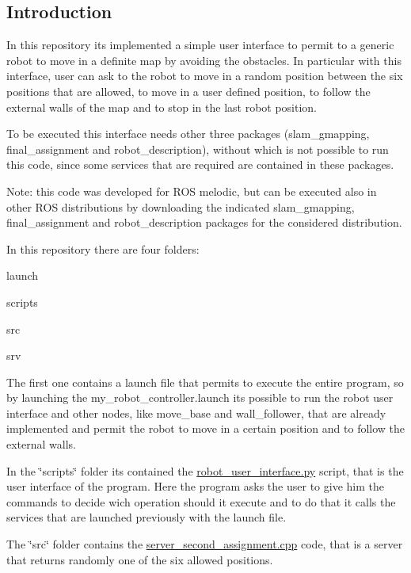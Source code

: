 \subsection*{Introduction}

In this repository it\textquotesingle{}s implemented a simple user interface to permit to a generic robot to move in a definite map by avoiding the obstacles. In particular with this interface, user can ask to the robot to move in a random position between the six positions that are allowed, to move in a user defined position, to follow the external walls of the map and to stop in the last robot position.

To be executed this interface needs other three packages (slam\+\_\+gmapping, final\+\_\+assignment and robot\+\_\+description), without which is not possible to run this code, since some services that are required are contained in these packages.

Note\+: this code was developed for R\+OS melodic, but can be executed also in other R\+OS distributions by downloading the indicated slam\+\_\+gmapping, final\+\_\+assignment and robot\+\_\+description packages for the considered distribution.

In this repository there are four folders\+:


\begin{DoxyItemize}
\item launch
\item scripts
\item src
\item srv
\end{DoxyItemize}

The first one contains a launch file that permits to execute the entire program, so by launching the my\+\_\+robot\+\_\+controller.\+launch it\textquotesingle{}s possible to run the robot user interface and other nodes, like move\+\_\+base and wall\+\_\+follower, that are already implemented and permit the robot to move in a certain position and to follow the external walls.

In the \char`\"{}scripts\char`\"{} folder it\textquotesingle{}s contained the \hyperlink{robot__user__interface_8py}{robot\+\_\+user\+\_\+interface.\+py} script, that is the user interface of the program. Here the program asks the user to give him the commands to decide wich operation should it execute and to do that it calls the services that are launched previously with the launch file.

The \char`\"{}src\char`\"{} folder contains the \hyperlink{_server__second__assignment_8cpp}{server\+\_\+second\+\_\+assignment.\+cpp} code, that is a server that returns randomly one of the six allowed positions.

